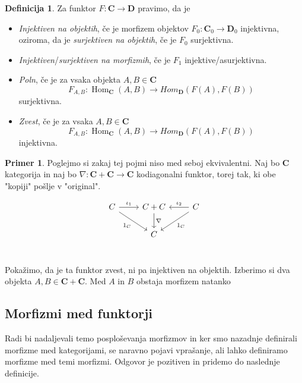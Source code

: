 \documentclass[12pt,a4paper]{book}
\theoremstyle{definition}
\newtheorem{definicija}{Definicija}[chapter]
\theoremstyle{plain}
\theoremstyle{definition}
\newtheorem{primer}{Primer}[section]
\theoremstyle{remark}
\newcommand{\cat}[1]{\textbf{#1}}
\DeclareMathOperator{\Hom}{Hom}
\begin{document}
\begin{definicija}
Za funktor $F : \cat{C} \to \cat{D}$ pravimo, da je 
\begin{itemize}
\item \emph{Injektiven na objektih}, če je morfizem objektov $F_0 : \cat{C}_0 \to \cat{D}_0$ injektivna, oziroma, da je \emph{surjektiven na objektih}, če je $F_0$ surjektivna.
\item \emph{Injektiven}/\emph{surjektiven na morfizmih}, če je $F_1$ injektive/asurjektivna.
\item \emph{Poln}, če je za vsaka objekta $A,B \in \cat{C}$
$$F_{A,B} : \Hom_{\cat{C}}(A,B) \to Hom_{\cat{D}}(F(A),F(B))$$
surjektivna.
\item \emph{Zvest}, če je za vsaka $A,B \in \cat{C}$
$$F_{A,B} : \Hom_{\cat{C}}(A,B) \to Hom_{\cat{D}}(F(A),F(B))$$
injektivna.
\end{itemize}
\end{definicija}

\begin{primer}
Poglejmo si zakaj tej pojmi niso med seboj ekvivalentni. Naj bo $\cat{C}$ kategorija in naj bo $\nabla : \cat{C} + \cat{C} \to \cat{C}$ kodiagonalni funktor, torej tak, ki obe "kopiji" pošlje v "original".

$$\begin{tikzcd}[column sep=normal]
C \ar[r, "\iota_1"] \ar[dr, "1_C"'] & C + C \ar[d, "\nabla"] & C \ar[l, "\iota_2"'] \ar[dl, "1_C"] \\
& C & \\
\end{tikzcd}$$

Pokažimo, da je ta funktor zvest, ni pa injektiven na objektih. Izberimo si dva objekta $A,B \in \cat{C} + \cat{C}$. Med $A$ in $B$ obstaja morfizem natanko 

\end{primer}

\subsection{Morfizmi med funktorji}
Radi bi nadaljevali temo posploševanja morfizmov in ker smo nazadnje definirali morfizme med kategorijami, se naravno pojavi vprašanje, ali lahko definiramo morfizme med temi morfizmi. Odgovor je pozitiven in pridemo do naslednje definicije.
\end{document}
